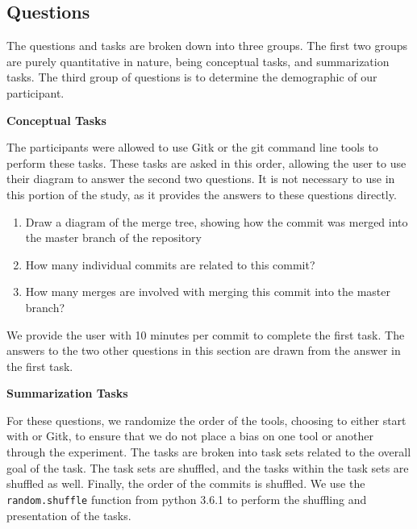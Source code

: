 \subsection{Questions}
\label{sub:questions}

The questions and tasks are broken down into three groups. The first two
groups are purely quantitative in nature, being conceptual tasks, and
summarization tasks. The third group of questions is to determine the
demographic of our participant.

\textbf{Conceptual Tasks}

The participants were allowed to use Gitk or the git command line tools
to perform these tasks. These tasks are asked in this order, allowing
the user to use their diagram to answer the second two questions. It is
not necessary to use \tool in this portion of the study, as it provides
the answers to these questions directly.

\begin{enumerate}
  \item Draw a diagram of the merge tree, showing how the commit was
    merged into the master branch of the repository
  \item How many individual commits are related to this commit?
  \item How many merges are involved with merging this commit into the
    master branch?
\end{enumerate}

We provide the user with 10 minutes per commit to complete the first
task. The answers to the two other questions in this section are drawn
from the answer in the first task.

\textbf{Summarization Tasks}

For these questions, we randomize the order of the tools, choosing to
either start with \tool or Gitk, to ensure that we do not place a bias
on one tool or another through the experiment. The tasks are broken
into task sets related to the overall goal of the task. The task sets
are shuffled, and the tasks within the task sets are shuffled as well.
Finally, the order of the commits is shuffled. We use the
\verb|random.shuffle| function from python 3.6.1 to perform the
shuffling and presentation of the tasks.

